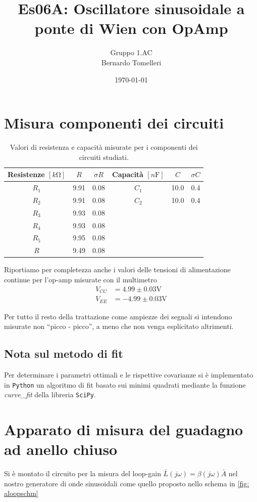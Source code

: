 \documentclass[10pt, a4paper, italian]{article}
\author{Gruppo 1.AC \\ Bernardo Tomelleri}
\title{Es06A: Oscillatore sinusoidale a ponte di Wien con OpAmp}
\begin{document}
\date{\today}
\maketitle

\setcounter{section}{0}

\section*{Misura componenti dei circuiti}
\begin{table}[htbp]
\centering
\begin{tabular}{cccccc}
\toprule
Resistenze $[\si{k\ohm}]$ & $R$ & $\sigma R$ & Capacità $[\si{n\F}]$ & $C$ &
$\sigma C$ \\
\midrule
\midrule
$R_1$	  & 9.91	& 0.08	 & $C_1$ & 10.0		 & 0.4 \\
$R_2$	  & 9.91	& 0.08 	 & $C_2$ & 10.0		 & 0.4 \\
$R_3$	  & 9.93	& 0.08	 & & & \\
$R_4$	  & 9.93	& 0.08	 & & & \\
$R_5$	  & 9.95	& 0.08	 & & & \\
$R$		  & 9.49	& 0.08	 & & & \\
\bottomrule     
\end{tabular}
\caption{Valori di resistenza e capacità misurate per i componenti dei
circuiti studiati. \label{tab: rcmes}}
\end{table}

Riportiamo per completezza anche i valori delle tensioni di alimentazione
continue per l'op-amp misurate con il multimetro
\begin{align*}
V_{CC} &= 4.99 \pm 0.03 \si{\V} \\
V_{EE} &= -4.99 \pm 0.03 \si{\V}
\end{align*}

Per tutto il resto della trattazione come ampiezze dei segnali si intendono
misurate non ``picco - picco'', a meno che non venga esplicitato altrimenti.

\subsection*{Nota sul metodo di fit}
Per determinare i parametri ottimali e le rispettive covarianze si \`e
implementato in \verb+Python+ un algoritmo di fit basato sui minimi quadrati
mediante la funzione \emph{curve\_fit} della libreria \texttt{SciPy}.

\section{Apparato di misura del guadagno ad anello chiuso}
Si è montato il circuito per la misura del loop-gain
$\bar{L}(j\omega) = \beta(j\omega) \bar{A}$ nel nostro generatore di
onde sinusoidali come quello proposto nello schema in \cref{fig: aloopschm}
\end{document}
